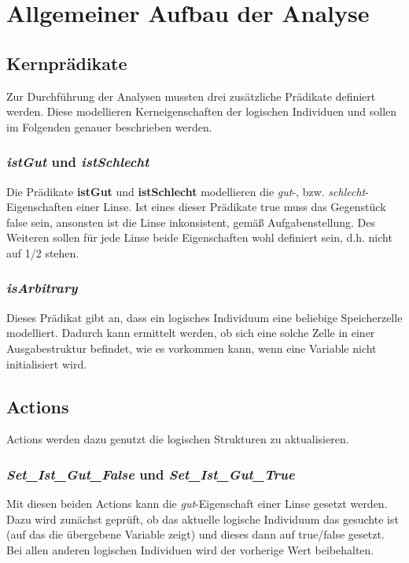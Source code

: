 \section{Allgemeiner Aufbau der Analyse}


\subsection{Kernprädikate}
Zur Durchführung der Analysen mussten drei zusätzliche Prädikate definiert werden. Diese modellieren Kerneigenschaften der logischen Individuen und sollen im Folgenden genauer beschrieben werden.

\subsubsection{\emph{istGut} und \emph{istSchlecht}}
Die Prädikate \textbf{istGut} und \textbf{istSchlecht} modellieren die \emph{gut}-, bzw. \emph{schlecht}-Eigenschaften einer Linse. Ist eines dieser Prädikate true muss das Gegenstück false sein, ansonsten ist die Linse inkonsistent, gemäß Aufgabenstellung. Des Weiteren sollen für jede Linse beide Eigenschaften wohl definiert sein, d.h. nicht auf 1/2 stehen.


\subsubsection{\emph{isArbitrary}}
Dieses Prädikat gibt an, dass ein logisches Individuum eine beliebige Speicherzelle modelliert. Dadurch kann ermittelt werden, ob sich eine solche Zelle in einer Ausgabestruktur befindet, wie es vorkommen kann, wenn eine Variable nicht initialisiert wird.



\subsection{Actions}
Actions werden dazu genutzt die logischen Strukturen zu aktualisieren.

\subsubsection{\emph{Set\_Ist\_Gut\_False} und \emph{Set\_Ist\_Gut\_True}}
Mit diesen beiden Actions kann die \emph{gut}-Eigenschaft einer Linse gesetzt werden. Dazu wird zunächst geprüft, ob das aktuelle logische Individuum das gesuchte ist (auf das die übergebene Variable zeigt) und dieses dann auf true/false gesetzt. Bei allen anderen logischen Individuen wird der vorherige Wert beibehalten.

